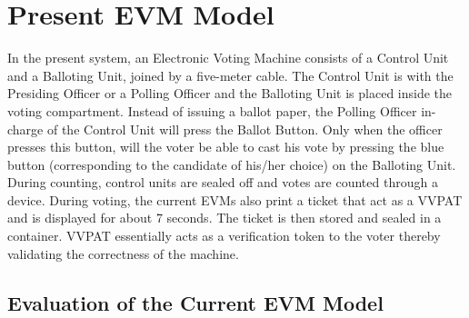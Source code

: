 \documentclass[11pt]{article}
\begin{document}
    
    \section{Present EVM Model}
    
    In the present system, an Electronic Voting Machine consists of a Control Unit and a Balloting Unit, joined by a five-meter cable. The Control Unit is with the Presiding Officer or a Polling Officer and the Balloting Unit is placed inside the voting compartment. Instead of issuing a ballot paper, the Polling Officer in-charge of the Control Unit will press the Ballot Button. Only when the officer presses this button, will the voter be able to cast his vote by pressing the blue button (corresponding to the candidate of his/her choice) on the Balloting Unit. During counting, control units are sealed off and votes are counted through a device. During voting, the current EVMs also print a ticket that act as a VVPAT and is displayed for about 7 seconds. The ticket is then stored and sealed in a container. VVPAT essentially acts as a verification token to the voter thereby validating the correctness of the machine.

    
    
    \subsection{Evaluation of the Current EVM Model}
    
\end{document}

